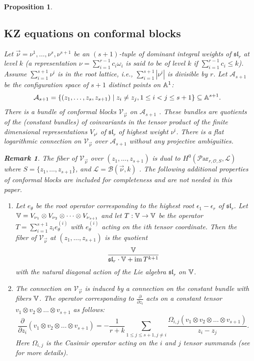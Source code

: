 \documentclass[11pt]{amsart}
\newcommand\tensor{\otimes}
\newcommand\ml{\mathcal{L}}
\newcommand\im{\operatorname{im}}
\newcommand\Par{\mathcal{P}\text{ar} }
\newtheorem{remark}[theorem]{ Remark}
\newtheorem{proposition}[theorem]{Proposition}
\numberwithin{theorem}{subsection}
\begin{document}
{\begin{proposition}
\subsection{KZ equations on conformal blocks}\label{chocolate}
 Let $\vec{\nu}=\nu^1,\dots,\nu^s,\nu^{s+1}$ be an $(s+1)$-tuple of dominant integral weights of $\mathfrak{sl}_r$ at level $k$ (a representation $\nu=\sum_{i=1}^{r-1} c_i\omega_i$ is said to be of level $k$ if $\sum_{i=1}^{r-1}c_i\leq k$). Assume $\sum_{i=1}^{s+1} \nu^i$ is in the root lattice, i.e., $\sum_{i=1}^{s+1}|\nu^i|$ is divisible by $r$. Let $\mathcal{A}_{s+1}$ be the configuration space of $s+1$ distinct points on $\Bbb{A}^1$:
$$\mathcal{A}_{s+1}=\{(z_1,\dots,z_s,z_{s+1})\mid z_i\neq z_j, 1\leq i<j \leq s+1\}\subseteq \Bbb{A}^{s+1}.$$
There is a bundle of conformal blocks $\mathcal{V}_{\vec{\nu}}$ on $\mathcal{A}_{s+1}$ \cite{tuy,sorger}. These bundles are quotients of the (constant bundles) of  coinvariants in the tensor product of the finite dimensional  representations $V_{\nu^i}$ of $\mathfrak{sl}_r$ of highest weight $\nu^i$. There is a flat logarithmic connection on $\mathcal{V}_{\vec{\nu}}$ over $\mathcal{A}_{s+1}$ without any projective ambiguities.
\begin{remark}
The fiber of $\mathcal{V}_{\vec{\nu}}$ over $(z_1,\dots,z_{s+1})$ is dual to $H^0(\Par_{r,\mathcal{O},S},\ml)$ where $S=\{z_1,\dots,z_{s+1}\}$, and $\ml=\mathcal{B}(\vec{\nu},k)$ \cite{pauly}. The following additional properties of conformal blocks are included for completeness and are not needed in this paper.
\begin{enumerate}
\item Let $e_{\theta}$ be the root operator corresponding to the highest root $\epsilon_1-\epsilon_r$ of $\mathfrak{sl}_r$. Let $\Bbb{V}= V_{\nu_1}\tensor V_{\nu_2}\tensor\dots \tensor V_{\nu_{s+1}}$ and let $T:\Bbb{V}\to \Bbb{V}$ be the operator $T=\sum_{i=1}^{s+1} z_i e_{\theta}^{(i)}$ with $e_{\theta}^{(i)}$ acting on the $i$th tensor coordinate.  Then the fiber of $\mathcal{V}_{\vec{\nu}}$
    at $(z_1,\dots,z_{s+1})$ is the quotient
    $$\frac{\Bbb{V}}{\mathfrak{sl}_r\cdot \Bbb{V} +\im T^{k+1}}$$ with the natural diagonal action of the Lie algebra $\mathfrak{sl}_r$  on $\Bbb{V}$.

\item The connection on $\mathcal{V}_{\vec{\nu}}$ is induced by a connection on the constant bundle with fibers $\Bbb{V}$. The  operator corresponding to $\frac{\partial}{\partial z_i}$ acts on a constant tensor $v_1\tensor v_2\tensor\dots\tensor v_{s+1}$ as follows:
    $$\frac{\partial}{\partial z_i}(v_1\tensor v_2\tensor\dots\tensor v_{s+1})=
    -\frac{1}{r+k}\sum_{1\leq j\leq s+1, j\neq i}\frac{ {\Omega_{i,j}}(v_1\tensor v_2\tensor\dots\tensor v_{s+1})}{z_i-z_j}.$$
Here $\Omega_{i,j}$ is the Casimir operator acting on the $i$ and $j$ tensor summands (see \cite[(5.40)]{Ueno} for more details).
\end{enumerate}
\end{remark}

\end{proposition}}
\end{document}
